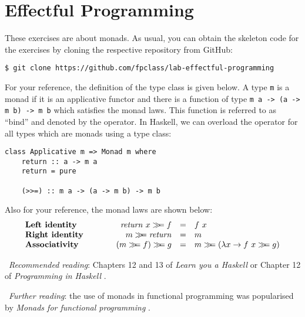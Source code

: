 \section{Effectful Programming}

These exercises are about monads. As usual, you can obtain the skeleton code for the exercises by cloning the respective repository from GitHub:
\begin{verbatim}
$ git clone https://github.com/fpclass/lab-effectful-programming
\end{verbatim}
For your reference, the definition of the  type class is given below. A type \texttt{\small m} is a monad if it is an applicative functor and there is a function of type \texttt{\small m~a -> (a -> m~b) -> m~b} which satisfies the monad laws. This function is referred to as ``bind'' and denoted by the  \haskellIn{(>>=)} operator. In Haskell, we can overload the \haskellIn{(>>=)} operator for all types which are monads using a type class:
\begin{verbatim}
class Applicative m => Monad m where 
    return :: a -> m a 
    return = pure 
    
    (>>=) :: m a -> (a -> m b) -> m b
\end{verbatim}
Also for your reference, the monad laws are shown below:
\begin{displaymath}
\begin{array}{lcrcl}
\textbf{Left identity} &\qquad & \mathit{return}~x \bind f & = & f~x \\
\textbf{Right identity} &\qquad & m \bind \mathit{return} & = & m \\
\textbf{Associativity} & \qquad & (m \bind f) \bind g & = & m \bind (\lambda x \to f~x \bind g)
\end{array}
\end{displaymath}

\faBook~\emph{Recommended reading}: Chapters 12 and 13 of \emph{Learn you a Haskell} \citep{lipovaca2011learn} or Chapter 12 of \emph{Programming in Haskell} \citep{hutton2016programming}.

\faBook~\emph{Further reading}: the use of monads in functional programming was popularised by \emph{Monads for functional programming} \citep{wadler1995monads}.

\taskLine 

